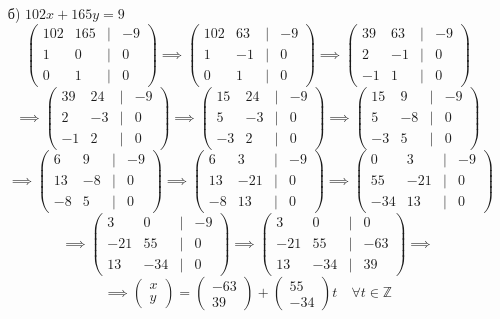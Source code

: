 \documentclass[a4paper]{article}
\newcommand{\mat}[1]{\begin{pmatrix} #1 \end{pmatrix}}
\newcommand{\ZZ}{\mathbb{Z}}
\begin{document}
\begin{enumerate}
\begin{enumerate}
        
        \item[б)]$102x+165y = 9$
        $$\mat{
            102 & 165 & | & -9\\
            1 & 0 & | & 0\\
            0 & 1 & | & 0
        } \implies \mat{
            102 & 63 & | & -9\\
            1 & -1 & | & 0\\
            0 & 1 & | & 0
        } \implies \mat{
            39 & 63 & | & -9\\
            2 & -1 & | & 0\\
            -1 & 1 & | & 0
        } $$$$\implies \mat{
            39 & 24 & | & -9\\
            2 & -3 & | & 0\\
            -1 & 2 & | & 0
        } \implies \mat{
            15 & 24 & | & -9\\
            5 & -3 & | & 0\\
            -3 & 2 & | & 0
        } \implies \mat{
            15 & 9 & | & -9\\
            5 & -8 & | & 0\\
            -3 & 5 & | & 0
        } $$$$\implies \mat{
            6 & 9 & | & -9\\
            13 & -8 & | & 0\\
            -8 & 5 & | & 0
        }\implies \mat{
            6 & 3 & | & -9\\
            13 & -21 & | & 0\\
            -8 & 13 & | & 0
        }\implies \mat{
            0 & 3 & | & -9\\
            55 & -21 & | & 0\\
            -34 & 13 & | & 0
        }$$$$\implies \mat{
            3 & 0 &  | & -9\\
            -21 & 55 &  | & 0\\
            13 & -34 & | & 0
        }\implies \mat{
            3 & 0 &  | & 0\\
            -21 & 55 &  | & -63\\
            13 & -34 & | & 39
        } \implies $$$$\implies \mat{x \\ y} = \mat{-63\\39}+\mat{55\\-34}t \quad \forall t \in \ZZ$$
    \end{enumerate}
\end{enumerate}
\end{document}
